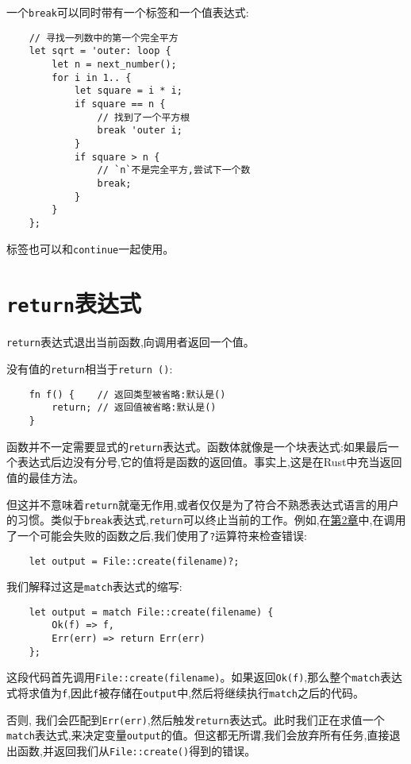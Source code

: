 一个\texttt{break}可以同时带有一个标签和一个值表达式:
\begin{verbatim}
    // 寻找一列数中的第一个完全平方
    let sqrt = 'outer: loop {
        let n = next_number();
        for i in 1.. {
            let square = i * i;
            if square == n {
                // 找到了一个平方根
                break 'outer i;
            }
            if square > n {
                // `n`不是完全平方,尝试下一个数
                break;
            }
        }
    };
\end{verbatim}

标签也可以和\texttt{continue}一起使用。

\section{\texttt{return}表达式}
\texttt{return}表达式退出当前函数,向调用者返回一个值。

没有值的\texttt{return}相当于\texttt{return ()}:
\begin{verbatim}
    fn f() {    // 返回类型被省略:默认是()
        return; // 返回值被省略:默认是()
    }
\end{verbatim}

函数并不一定需要显式的\texttt{return}表达式。函数体就像是一个块表达式:如果最后一个表达式后边没有分号,它的值将是函数的返回值。事实上,这是在Rust中充当返回值的最佳方法。

但这并不意味着\texttt{return}就毫无作用,或者仅仅是为了符合不熟悉表达式语言的用户的习惯。类似于\texttt{break}表达式,\texttt{return}可以终止当前的工作。例如,在\hyperref[ch02]{第2章}中,在调用了一个可能会失败的函数之后,我们使用了\texttt{?}运算符来检查错误:
\begin{verbatim}
    let output = File::create(filename)?;
\end{verbatim}

我们解释过这是\texttt{match}表达式的缩写:
\begin{verbatim}
    let output = match File::create(filename) {
        Ok(f) => f,
        Err(err) => return Err(err)
    };
\end{verbatim}

这段代码首先调用\texttt{File::create(filename)}。如果返回\texttt{Ok(f)},那么整个\texttt{match}表达式将求值为\texttt{f},因此\texttt{f}被存储在\texttt{output}中,然后将继续执行\texttt{match}之后的代码。

否则, 我们会匹配到\texttt{Err(err)},然后触发\texttt{return}表达式。此时我们正在求值一个\texttt{match}表达式,来决定变量\texttt{output}的值。但这都无所谓,我们会放弃所有任务,直接退出函数,并返回我们从\texttt{File::create()}得到的错误。

